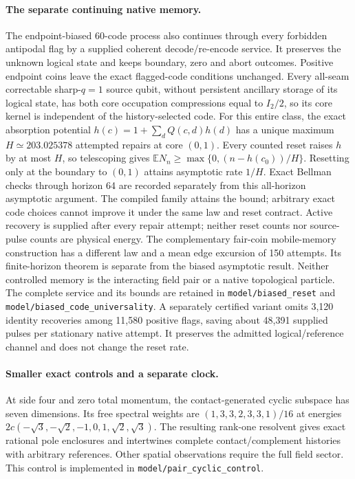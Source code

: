 \paragraph{The separate continuing native memory.}
The endpoint-biased 60-code process also continues through every
forbidden antipodal flag by a supplied coherent decode/re-encode service.
It preserves the unknown logical state and keeps boundary, zero and abort
outcomes. Positive endpoint coins leave the exact flagged-code conditions
unchanged. Every all-seam correctable sharp-$q=1$ source qubit, without
persistent ancillary storage of its logical state, has both core
occupation compressions equal to $I_2/2$, so its core kernel is independent
of the history-selected code. For this entire class, the exact absorption potential
$h(c)=1+\sum_dQ(c,d)h(d)$ has a unique maximum
$H\simeq203.025378$ attempted repairs at core $(0,1)$.
Every counted reset raises $h$ by at most $H$, so telescoping gives
$\mathbb E N_n\ge\max\{0,(n-h(c_0))/H\}$. Resetting only at the
boundary to $(0,1)$ attains asymptotic rate $1/H$. Exact Bellman checks
through horizon 64 are recorded separately from this all-horizon
asymptotic argument. The compiled family attains the bound; arbitrary exact
code choices cannot improve it under the same law and reset contract.
Active recovery is supplied after every repair attempt;
neither reset counts nor source-pulse counts are physical energy.
The complementary fair-coin mobile-memory construction has a different
law and a mean edge excursion of 150 attempts. Its finite-horizon theorem
is separate from the biased asymptotic result. Neither controlled memory is the interacting field pair or a
native topological particle. The complete service and its bounds are
retained in \texttt{model/biased\_reset} and
\texttt{model/biased\_code\_universality}. A separately certified variant
omits 3,120 identity recoveries among 11,580 positive flags, saving about
48,391 supplied pulses per stationary native attempt. It preserves the
admitted logical/reference channel and does not change the reset rate.

\paragraph{Smaller exact controls and a separate clock.}
At side four and zero total momentum, the contact-generated cyclic
subspace has seven dimensions. Its free spectral weights are
$(1,3,3,2,3,3,1)/16$ at energies
$2c(-\sqrt3,-\sqrt2,-1,0,1,\sqrt2,\sqrt3)$.
The resulting rank-one resolvent gives exact rational pole enclosures
and intertwines complete contact/complement histories with arbitrary
references. Other spatial observations require the full field sector.
This control is implemented in \texttt{model/pair\_cyclic\_control}.

